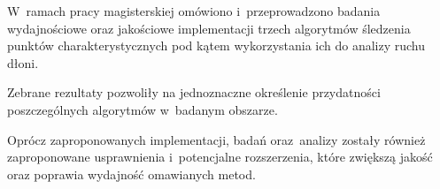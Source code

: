 W~ramach pracy magisterskiej omówiono i~przeprowadzono badania wydajnościowe oraz jakościowe implementacji trzech algorytmów śledzenia punktów charakterystycznych pod kątem wykorzystania ich do analizy ruchu dłoni.

Zebrane rezultaty pozwoliły na jednoznaczne określenie przydatności poszczególnych algorytmów w~badanym obszarze.

Oprócz zaproponowanych implementacji, badań oraz~analizy zostały również zaproponowane usprawnienia i~potencjalne rozszerzenia, które zwiększą jakość oraz poprawia wydajność omawianych metod.
